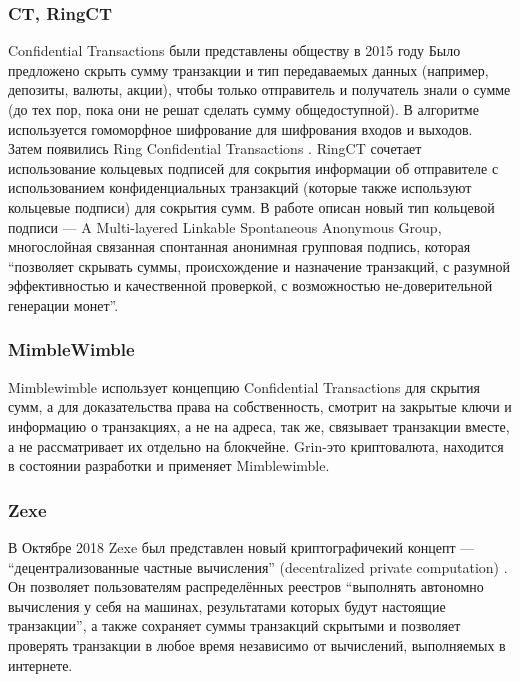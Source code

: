 \subsubsection{CT, RingCT}\label{ringct}
Confidential Transactions были представлены обществу в 2015 году \cite{Maxwell}
Было предложено скрыть сумму транзакции и тип передаваемых данных (например,
депозиты, валюты, акции), чтобы только отправитель и получатель знали о сумме
(до тех пор, пока они не решат сделать сумму общедоступной). В алгоритме
используется гомоморфное шифрование для шифрования входов и выходов.\\

Затем появились Ring Confidential Transactions \cite{Noether2016}.  RingCT
сочетает использование кольцевых подписей для сокрытия информации об
отправителе с использованием конфиденциальных транзакций (которые также
используют кольцевые подписи) для сокрытия сумм. В работе описан новый тип
кольцевой подписи --- A Multi-layered Linkable Spontaneous Anonymous Group,
многослойная связанная спонтанная анонимная групповая подпись, которая
``позволяет скрывать суммы, происхождение и назначение транзакций, с разумной
эффективностью и качественной проверкой, с возможностью не-доверительной
генерации монет''.

\subsubsection{MimbleWimble}
Mimblewimble \cite{Poelstra2016} использует концепцию Confidential Transactions
для скрытия сумм, а для доказательства права на собственность, смотрит на
закрытые ключи и информацию о транзакциях, а не на адреса, так же, связывает
транзакции вместе, а не рассматривает их отдельно на блокчейне. Grin-это
криптовалюта, находится в состоянии разработки и применяет Mimblewimble.

\subsubsection{Zexe}
В Октябре 2018 Zexe был представлен новый криптографичекий концепт ---
``децентрализованные частные вычисления'' (decentralized private computation)
\cite{Bowe2019}. Он позволяет пользователям распределённых реестров ``выполнять
автономно вычисления у себя на машинах, результатами которых будут настоящие
транзакции'', а также сохраняет суммы транзакций скрытыми и позволяет проверять
транзакции в любое время независимо от вычислений, выполняемых в интернете.

